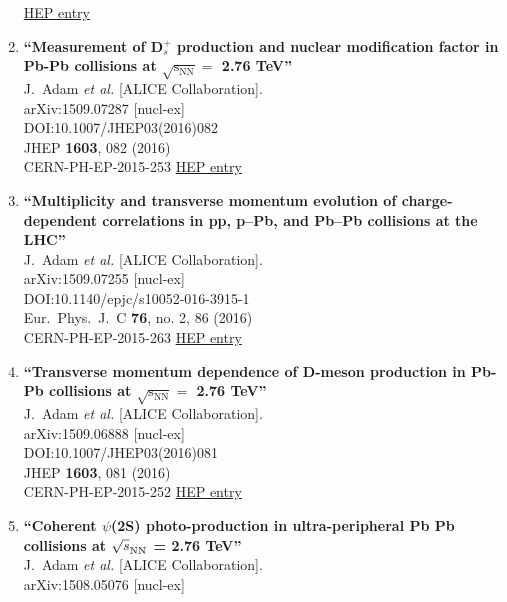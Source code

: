 \begin{enumerate}
\href{http://inspirehep.net/record/1394676}{HEP entry}
\item%
{\bf ``Measurement of D$_{s}^{+}$ production and nuclear modification factor in Pb-Pb collisions at $ \sqrt{{\mathrm{s}}_{\mathrm{NN}}}=$ 2.76 TeV''}
  \\{}J.~Adam {\it et al.} [ALICE Collaboration].
  \\{}arXiv:1509.07287 [nucl-ex]
  \\{}DOI:10.1007/JHEP03(2016)082
  \\{}JHEP {\bf 1603}, 082 (2016)
  \\{}CERN-PH-EP-2015-253
\href{http://inspirehep.net/record/1394675}{HEP entry}
\item%
{\bf ``Multiplicity and transverse momentum evolution of charge-dependent correlations in pp, p–Pb, and Pb–Pb collisions at the LHC''}
  \\{}J.~Adam {\it et al.} [ALICE Collaboration].
  \\{}arXiv:1509.07255 [nucl-ex]
  \\{}DOI:10.1140/epjc/s10052-016-3915-1
  \\{}Eur.\ Phys.\ J.\ C {\bf 76}, no. 2, 86 (2016)
  \\{}CERN-PH-EP-2015-263
\href{http://inspirehep.net/record/1394672}{HEP entry}
\item%
{\bf ``Transverse momentum dependence of D-meson production in Pb-Pb collisions at $ \sqrt{{\mathrm{s}}_{\mathrm{NN}}}=$ 2.76  TeV''}
  \\{}J.~Adam {\it et al.} [ALICE Collaboration].
  \\{}arXiv:1509.06888 [nucl-ex]
  \\{}DOI:10.1007/JHEP03(2016)081
  \\{}JHEP {\bf 1603}, 081 (2016)
  \\{}CERN-PH-EP-2015-252
\href{http://inspirehep.net/record/1394580}{HEP entry}
\item%
{\bf ``Coherent $\psi$(2S) photo-production in ultra-peripheral Pb Pb collisions at $\sqrt{s}_{\rm NN}$ = 2.76 TeV''}
  \\{}J.~Adam {\it et al.} [ALICE Collaboration].
  \\{}arXiv:1508.05076 [nucl-ex]

\end{enumerate}
